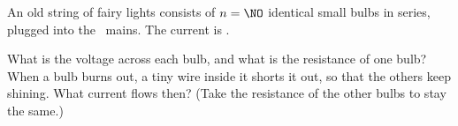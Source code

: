 An old string of fairy lights consists of $n = \NO$ identical small bulbs in series, plugged into the \VO\ mains. The current is \IO.

\begin{abcliste}
\abc What is the voltage across each bulb, and what is the resistance of one bulb?
\abc When a bulb burns out, a tiny wire inside it shorts it out, so that the others keep shining. What current flows then? (Take the resistance of the other bulbs to stay the same.)
\end{abcliste}
